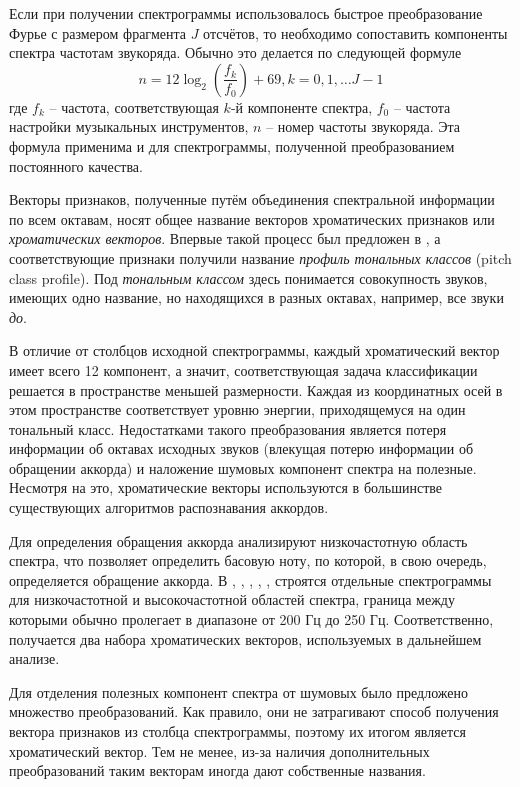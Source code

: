 Если при получении спектрограммы использовалось быстрое преобразование Фурье с
размером фрагмента $J$ отсчётов, то необходимо сопоставить компоненты спектра
частотам звукоряда. Обычно это делается по следующей формуле
\begin{equation}
n = 12 \log_2 \left( \frac{f_k}{f_0} \right) + 69, k = 0, 1,\ldots J-1
\label{fft_wrap}
\end{equation}
где $f_k$ -- частота, соответствующая $k$-й компоненте спектра, $f_0$ -- частота
настройки музыкальных инструментов, $n$ -- номер частоты звукоряда. Эта формула
применима и для спектрограммы, полученной преобразованием постоянного качества.

Векторы признаков, полученные путём объединения спектральной информации по всем
октавам, носят общее название векторов хроматических признаков или
\emph{хроматических векторов}. Впервые такой процесс был предложен в
\cite{Fujishima1999}, а соответствующие признаки получили название
\emph{профиль тональных классов} (pitch class profile). Под \emph{тональным
классом} здесь понимается совокупность звуков, имеющих одно название, но
находящихся в разных октавах, например, все звуки \emph{до}.

В отличие от столбцов исходной спектрограммы, каждый хроматический вектор имеет
всего 12 компонент, а значит, соответствующая задача классификации решается в
пространстве меньшей размерности. Каждая из координатных осей в этом
пространстве соответствует уровню энергии, приходящемуся на один тональный
класс. Недостатками такого преобразования является потеря информации об октавах
исходных звуков (влекущая потерю информации об обращении аккорда) и наложение
шумовых компонент спектра на полезные. Несмотря на это, хроматические векторы
используются в большинстве существующих алгоритмов распознавания аккордов.

Для определения обращения аккорда анализируют низкочастотную область спектра,
что позволяет определить басовую ноту, по которой, в свою очередь, определяется
обращение аккорда. В \cite{Mauch2008}, \cite{Mauch2009}, \cite{Khadkevich2011},
\cite{Ni2011}, \cite{DeHaas2012}, \cite{Chen2012} строятся отдельные
спектрограммы для низкочастотной и высокочастотной областей спектра, граница
между которыми обычно пролегает в диапазоне от 200 Гц до 250 Гц.
Соответственно, получается два набора хроматических векторов, используемых в
дальнейшем анализе. 

Для отделения полезных компонент спектра от шумовых было предложено множество
преобразований. Как правило, они не затрагивают способ получения вектора
признаков из столбца спектрограммы, поэтому их итогом является хроматический
вектор. Тем не менее, из-за наличия дополнительных преобразований таким векторам
иногда дают собственные названия.

